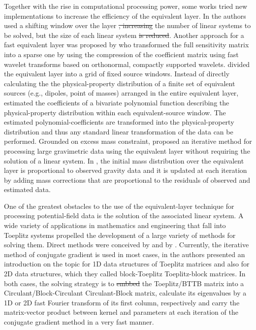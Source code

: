 \documentclass[manuscript]{geophysics}
\providecommand{\DIFaddtex}[1]{{\protect\color{blue}\uwave{#1}}} %
\providecommand{\DIFdeltex}[1]{{\protect\color{red}\sout{#1}}}                      %
\providecommand{\DIFaddbegin}{} %
\providecommand{\DIFaddend}{} %
\providecommand{\DIFdelbegin}{} %
\providecommand{\DIFdelend}{} %
\providecommand{\DIFadd}[1]{\texorpdfstring{\DIFaddtex{#1}}{#1}} %
\providecommand{\DIFdel}[1]{\texorpdfstring{\DIFdeltex{#1}}{}} %
\begin{document}
	Together with the rise in computational processing power, some works tried new implementations to increase the efficiency of the equivalent layer. 
	In \cite{leao-silva1989} the authors used a shifting window over the layer \DIFdelbegin \DIFdel{, increasing }\DIFdelend \DIFaddbegin \DIFadd{to increase }\DIFaddend the number of linear systems to be solved, but \DIFaddbegin \DIFadd{to reduced }\DIFaddend the size of each linear system \DIFdelbegin \DIFdel{is reduced}\DIFdelend \DIFaddbegin \DIFadd{at the same time}\DIFaddend . 
	Another approach for a fast equivalent layer was proposed by \cite{li-oldenburg2010}  who transformed the full sensitivity matrix into a sparse one by using  the compression of the coefficient matrix 
	using fast wavelet transforms based on orthonormal, compactly supported wavelets.  
	\cite{oliveirajr-etal2013} divided the equivalent layer into a grid of fixed source windows.
	Instead of directly calculating the the physical-property distribution of a finite set of equivalent
	sources (e.g., dipoles, point of masses) arranged in the entire equivalent layer,
	\cite{oliveirajr-etal2013} estimated the coefficients of a bivariate polynomial function describing 
	the physical-property distribution within each equivalent-source window.
	The estimated polynomial-coefficients are transformed into the physical-property distribution
	and thus any standard linear transformation of the data can be performed.
	Grounded on excess mass constraint, \cite{siqueira-etal2017} proposed an iterative method 
	for processing large gravimetric data using the equivalent layer without requiring the solution 
	of a linear system. 
	In \cite{siqueira-etal2017}, the initial mass distribution over the equivalent layer is
	proportional to observed gravity data and it is updated at each iteration by adding mass corrections that are proportional to the residuals of observed and estimated data.
	
	One of the greatest obstacles to the use of the equivalent-layer technique for processing potential-field data is the solution of the associated linear system.
	A wide variety of applications in mathematics and engineering that fall into Toeplitz systems propelled the development of a large variety of  methods for solving them. Direct methods were conceived by \cite{levinson1946} and by \cite{trench1964}. Currently, the iterative method of conjugate gradient is used in most cases, in \cite{chan-jin2007} the authors presented an introduction on the topic for 1D data structures of Toeplitz matrices and also for 2D data structures, which they called block-Toeplitz Toeplitz-block matrices. In both cases, the solving strategy is to \DIFdelbegin \DIFdel{embbed }\DIFdelend \DIFaddbegin \DIFadd{embed }\DIFaddend the Toeplitz/BTTB matrix into a Circulant/Block-Circulant Circulant-Block matrix, calculate its eigenvalues by a 1D or 2D fast Fourier transform of its first column, respectively and carry the matrix-vector product between kernel and parameters at each iteration of the conjugate gradient method in a very fast manner.
	
\end{document}
